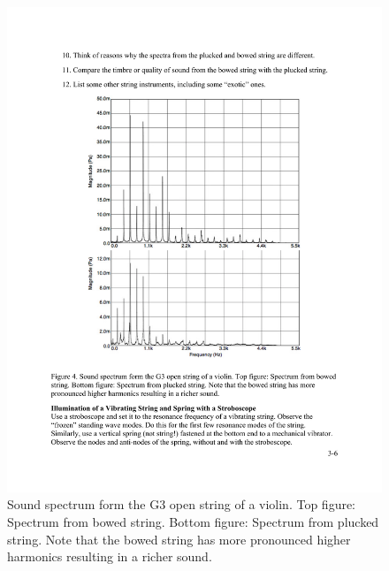 \documentclass[11pt]{NSF}
\begin{document}
\begin{figure}[hbtp] 
\begin{center} 
\includegraphics[width=.75\textwidth]{fig3_4}
\caption{Sound spectrum form the G3 open string of a violin. 
Top figure: Spectrum from bowed string. 
Bottom figure: Spectrum from plucked string. 
Note that the bowed string has more pronounced higher harmonics 
resulting in a richer sound.}
\label{f:4} 
\end{center} 
\end{figure}
%
\end{document}
